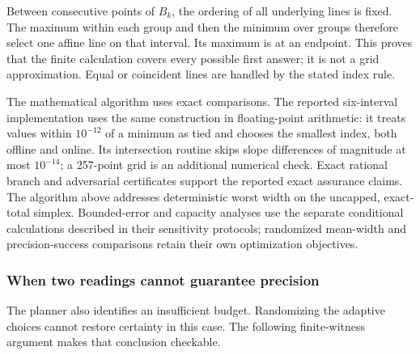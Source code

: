 \documentclass[12pt]{article}
\begin{document}
\begin{center}
\end{center}

Between consecutive points of $B_k$, the ordering of all underlying lines
is fixed.  The maximum within each group and then the minimum over groups
therefore select one affine line on that interval.  Its maximum is at an
endpoint.  This proves that the finite calculation covers every possible
first answer; it is not a grid approximation.  Equal or coincident lines
are handled by the stated index rule.

The mathematical algorithm uses exact comparisons.  The reported
six-interval implementation uses the same construction in floating-point
arithmetic: it treats values within $10^{-12}$ of a minimum as tied and
chooses the smallest index, both offline and online.  Its intersection
routine skips slope differences of magnitude at most $10^{-14}$; a
257-point grid is an additional numerical check.  Exact rational branch
and adversarial certificates support the reported exact assurance claims.
The algorithm above addresses deterministic worst width on the uncapped,
exact-total simplex.  Bounded-error and capacity analyses use the separate
conditional calculations described in their sensitivity protocols;
randomized mean-width and precision-success comparisons retain their own
optimization objectives.
\subsubsection{When two readings cannot guarantee precision}
\label{sec:assurance-feasibility}
The planner also identifies an insufficient budget. Randomizing the
adaptive choices cannot restore certainty in this case. The following
finite-witness argument makes that conclusion checkable.
\end{document}
